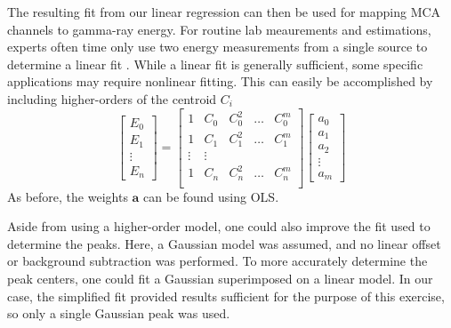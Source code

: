 The resulting fit from our linear regression can then be used for mapping
MCA channels to gamma-ray energy. For routine lab meaurements and estimations, experts often time only use two energy measurements from a single source to determine a linear fit \cite{gilmore_2011}.
While a linear fit is generally sufficient, some specific applications may require nonlinear fitting.
This can easily be accomplished by including higher-orders of the centroid $C_i$
\begin{equation}
    \begin{bmatrix}
        E_0 \\ E_1 \\ \vdots \\ E_n
    \end{bmatrix} =
    \begin{bmatrix}
        1 & C_0  & C_0^2 & \dots &  C_0^m\\
        1 & C_1  & C_1^2 & \dots &  C_1^m\\
        \vdots & \vdots \\
        1 & C_n  & C_n^2 & \dots &  C_n^m\\
    \end{bmatrix}
    \begin{bmatrix}
        a_0 \\ a_1 \\ a_2 \\ \vdots \\ a_m
    \end{bmatrix}
\end{equation}
As before, the weights $\mathbf{a}$ can be found using OLS.

Aside from using a higher-order model, one could also improve the fit used to
determine the peaks. Here, a Gaussian model was assumed, and no linear offset
or background subtraction was performed. To more accurately determine the peak centers,
one could fit a Gaussian superimposed on a linear model. In our case, the
simplified fit provided results sufficient for the purpose of this exercise,
so only a single Gaussian peak was used.
